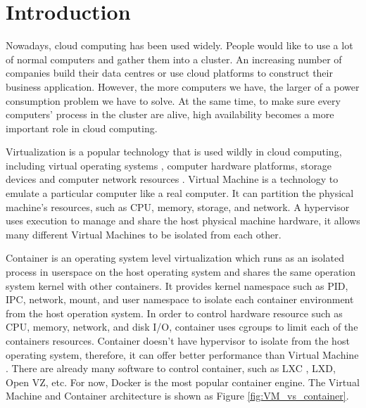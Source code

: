 \chapter{Introduction}
\label{chap:intro}
Nowadays, cloud computing \cite{armbrust2010view} has been used widely. People would like to use a lot of normal computers and gather them into a cluster.
An increasing number of companies build their data centres or use cloud platforms to construct their business application.
However, the more computers we have, the larger of a power consumption problem we have to solve. At the same time, to make sure every computers' process in the cluster are alive, high availability \cite{cully2008remus,gray1991high} becomes a more important role in cloud computing.

Virtualization is a popular technology that is used wildly in cloud computing, including virtual operating systems \cite{miller2007virtualization,yan2011development}, computer hardware platforms, storage devices \cite{singh2008server} and computer network resources \cite{chowdhury2010survey}.
Virtual Machine \cite{goldberg1974survey} is a technology to emulate a particular computer like a real computer. It can partition the physical machine's resources, such as CPU, memory, storage, and network.
A hypervisor \cite{younge2011analysis, gavrilovska2007high} uses execution to manage and share the host physical machine hardware, it allows many different Virtual Machines to be isolated from each other.

Container \cite{soltesz2007container} is an operating system level virtualization which runs as an isolated process in userspace on the host operating system and shares the same operation system kernel with other containers.
It provides kernel namespace \cite{biederman2006multiple} such as PID, IPC, network, mount, and user namespace to isolate each container environment from the host operation system.
In order to control hardware resource such as CPU, memory, network, and disk I/O, container uses cgroups to limit each of the containers resources.
Container doesn't have hypervisor to isolate from the host operating system, therefore, it can offer better performance than Virtual Machine \cite{xavier2013performance, dua2014virtualization}. There are already many software to control container, such as LXC \cite{helsley2009lxc}, LXD, Open VZ, etc. For now, Docker \cite{Docker} is the most popular container engine. The Virtual Machine and Container architecture is shown as Figure \ref{fig:VM_vs_container}.

